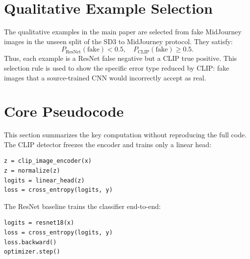 \documentclass[conference]{IEEEtran}
\begin{document}
\section{Qualitative Example Selection}

The qualitative examples in the main paper are selected from fake MidJourney
images in the unseen split of the SD3 to MidJourney protocol. They satisfy:
\begin{equation}
P_{\mathrm{ResNet}}(\mathrm{fake}) < 0.5,\quad
P_{\mathrm{CLIP}}(\mathrm{fake}) \geq 0.5.
\end{equation}
Thus, each example is a ResNet false negative but a CLIP true positive. This
selection rule is used to show the specific error type reduced by CLIP: fake
images that a source-trained CNN would incorrectly accept as real.

\section{Core Pseudocode}

This section summarizes the key computation without reproducing the full code.
The CLIP detector freezes the encoder and trains only a linear head:
\begin{verbatim}
z = clip_image_encoder(x)
z = normalize(z)
logits = linear_head(z)
loss = cross_entropy(logits, y)
\end{verbatim}

The ResNet baseline trains the classifier end-to-end:
\begin{verbatim}
logits = resnet18(x)
loss = cross_entropy(logits, y)
loss.backward()
optimizer.step()
\end{verbatim}
\end{document}
